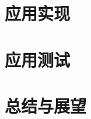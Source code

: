 \documentclass{ecnuthesis}
\begin{document}
    \chapter{应用实现}\label{ch:implement}


    \chapter{应用测试}\label{ch:test}


    \chapter{总结与展望}\label{ch:conclusion}


    \backmatter
    \PrintReference

    \begin{appendix}
    \end{appendix}

    \begin{acknowledgement}
    \end{acknowledgement}
\end{document}
